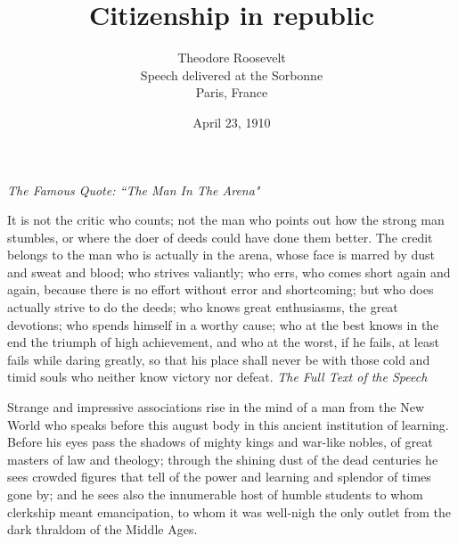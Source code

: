 \documentclass{scrbook}
\begin{document}
\sloppy
\title{Citizenship in republic}
\author{%
Theodore Roosevelt\\
Speech delivered at the Sorbonne\\
Paris, France
}
\date{April 23, 1910}
\maketitle
\noindent

\emph{The Famous Quote: ``The Man In The Arena"}

It is not the critic who counts; not the man who points out how the strong man stumbles,
or where the doer of deeds could have done them better. The credit belongs to the man who
is actually in the arena, whose face is marred by dust and sweat and blood; who strives
valiantly; who errs, who comes short again and again, because there is no effort without
error and shortcoming; but who does actually strive to do the deeds; who knows great
enthusiasms, the great devotions; who spends himself in a worthy cause; who at the best
knows in the end the triumph of high achievement, and who at the worst, if he fails, at least
fails while daring greatly, so that his place shall never be with those cold and timid souls
who neither know victory nor defeat.
\newpage
\emph{The Full Text of the Speech}

Strange and impressive associations rise in the mind of a man from the New World who
speaks before this august body in this ancient institution of learning. Before his eyes pass
the shadows of mighty kings and war-like nobles, of great masters of law and theology;
through the shining dust of the dead centuries he sees crowded figures that tell of the power
and learning and splendor of times gone by; and he sees also the innumerable host of humble
students to whom clerkship meant emancipation, to whom it was well-nigh the only outlet
from the dark thraldom of the Middle Ages.
\end{document}
